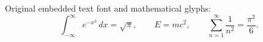 \documentclass{article}
\begin{document}
Original embedded text font and mathematical glyphs:
\[
  \int_{-\infty}^{\infty} e^{-x^2}\,dx = \sqrt{\pi},
  \qquad E = mc^2,
  \qquad \sum_{n=1}^{\infty}\frac{1}{n^2}=\frac{\pi^2}{6}.
\]
\end{document}
